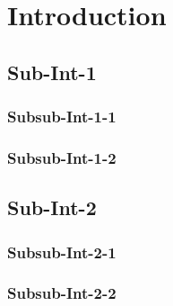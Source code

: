 \chapter{Introduction}%
\label{chap:introduction}%
\par\bigskip\noindent%
\TUMchaptertableofcontents*%
\section{Sub-Int-1}%
\label{sec:introduction:Sub-Int-1}%
\subsection{Subsub-Int-1-1}%
\label{subsec:introduction:Sub-Int-1:Subsub-Int-1-1}%
\subsection{Subsub-Int-1-2}%
\label{subsec:introduction:Sub-Int-1:Subsub-Int-1-2}%
\section{Sub-Int-2}%
\label{sec:introduction:Sub-Int-2}%
\subsection{Subsub-Int-2-1}%
\label{subsec:introduction:Sub-Int-2:Subsub-Int-2-1}%
\subsection{Subsub-Int-2-2}%
\label{subsec:introduction:Sub-Int-2:Subsub-Int-2-2}%